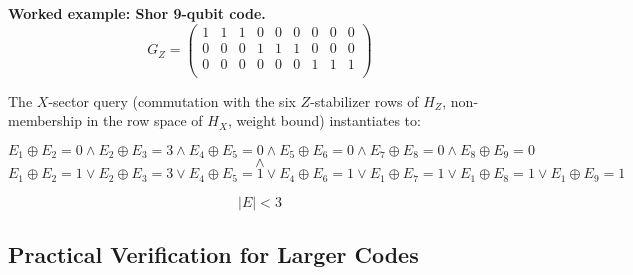 \begin{mybox}{\textbf{Worked example: Shor 9-qubit code.}}
$$G_Z = \begin{pmatrix}
    1&1&1&0&0&0&0&0&0\\
0&0&0&1&1&1&0&0&0\\
0&0&0&0&0&0&1&1&1\\
\end{pmatrix}$$

%

The $X$-sector query (commutation with the six $Z$-stabilizer rows of $H_Z$,
non-membership in the row space of $H_X$, weight bound) instantiates to:

$$E_1 \oplus E_2 = 0 \wedge E_2 \oplus E_3 = 3 \wedge E_4 \oplus E_5 =0 \wedge
E_5 \oplus E_6 = 0 \wedge E_7 \oplus E_8 = 0 \wedge E_8 \oplus E_9 = 0 $$
$$\wedge$$
$$E_1 \oplus E_2 = 1 \vee E_2 \oplus E_3 = 3 \vee E_4 \oplus E_5 =1 \vee E_4
\oplus E_6 = 1 \vee E_1 \oplus E_7 = 1 \vee E_1 \oplus E_8 = 1 \vee E_1 \oplus
E_9 = 1 $$

$$|E| < 3$$
    
\end{mybox}
 

\subsection{Practical Verification for Larger Codes}

